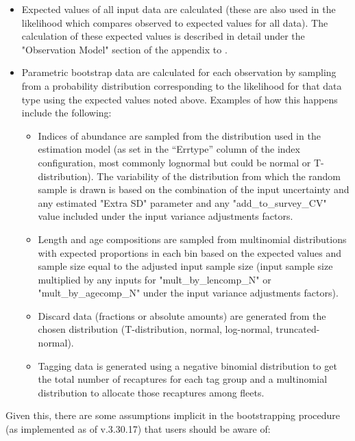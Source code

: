 \begin{itemize}
	\item Expected values of all input data are calculated (these are also used in the likelihood which compares observed to expected values for all data). The calculation of these expected values is described in detail under the "Observation Model" section of the appendix to \citet{methotstock2013}. \
	
	\item Parametric bootstrap data are calculated for each observation by sampling from a probability distribution corresponding to the likelihood for that data type using the expected values noted above. Examples of how this happens include the following:
	
	\begin{itemize}
		\item Indices of abundance are sampled from the distribution used in the estimation model (as set in the ``Errtype'' column of the index configuration, most commonly lognormal but could be normal or T-distribution). The variability of the distribution from which the random sample is drawn is based on the combination of the input uncertainty and any estimated "Extra SD" parameter and any "add\_to\_survey\_CV" value included under the input variance adjustments factors.
		
		\item Length and age compositions are sampled from multinomial distributions with expected proportions in each bin based on the expected values and sample size equal to the adjusted input sample size (input sample size multiplied by any inputs for "mult\_by\_lencomp\_N" or "mult\_by\_agecomp\_N" under the input variance adjustments factors).
		
		\item Discard data (fractions or absolute amounts) are generated from the chosen distribution (T-distribution, normal, log-normal, truncated-normal).
		
		\item Tagging data is generated using a negative binomial distribution to get the total number of recaptures for each tag group and a multinomial distribution to allocate those recaptures among fleets.
	\end{itemize}
\end{itemize}

Given this, there are some assumptions implicit in the bootstrapping procedure (as implemented as of v.3.30.17) that users should be aware of:

